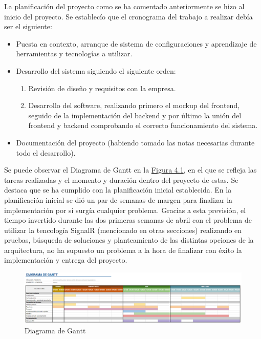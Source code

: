 La planificación del proyecto como se ha comentado anteriormente se hizo al inicio del proyecto. Se establecío que el cronograma del trabajo a realizar debía ser el siguiente:
\begin{itemize}
    \item Puesta en contexto, arranque de sistema de configuraciones y aprendizaje de herramientas y tecnologías a utilizar.
    \item Desarrollo del sistema siguiendo el siguiente orden:
    \begin{enumerate}
        \item Revisión de diseño y requisitos con la empresa.
        \item Desarrollo del software, realizando primero el mockup del frontend, seguido de la implementación del backend y por último la unión del frontend y backend comprobando el correcto funcionamiento del sistema.
    \end{enumerate}
    \item Documentación del proyecto (habiendo tomado las notas necesarias durante todo el desarrollo).
\end{itemize}

Se puede observar el Diagrama de Gantt en la \hyperref[fig:fig:gantt]{Figura 4.1}, en el que se refleja las tareas realizadas y el momento y duración dentro del proyecto de estas. Se destaca que se ha cumplido con la planificación inicial establecida. En la planificación inicial se dió un par de semanas de margen para finalizar la implementación por si surgía cualquier problema. Gracias a esta previsión, el tiempo invertido durante las dos primeras semanas de abril con el problema de utilizar la tencología SignalR (mencionado en otras secciones) realizando en pruebas, búsqueda de soluciones y planteamiento de las distintas opciones de la arquitectura, no ha supuesto un problema a la hora de finalizar con éxito la implementación y entrega del proyecto.

\begin{landscape}
    \begin{figure}[!ht]
        \centering
        \includegraphics[width=25cm]{Imagenes/Diagrama-Gantt.PNG}
        \caption{Diagrama de Gantt}
        \label{fig:gantt}
    \end{figure}
\end{landscape}



